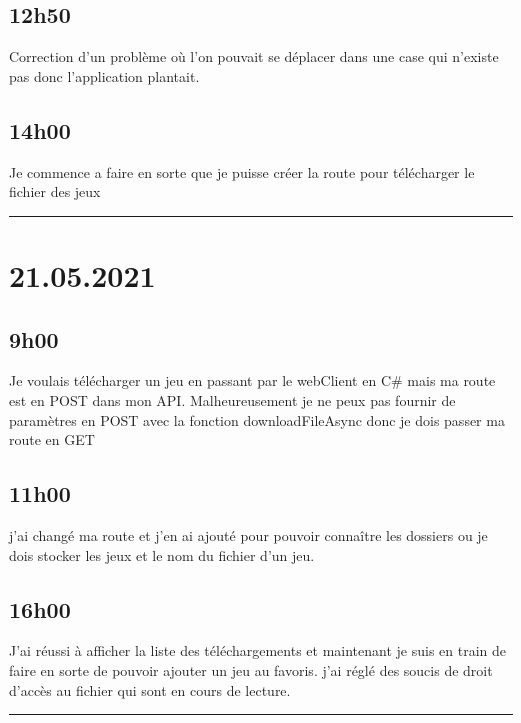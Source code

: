 \documentclass[a4paper,12pt,french]{sphinxmanual}
\begin{document}
\subsection{12h50}
\label{\detokenize{logbook:id140}}
\sphinxAtStartPar
Correction d’un problème où l’on pouvait se déplacer dans une case qui n’existe pas donc l’application plantait.


\subsection{14h00}
\label{\detokenize{logbook:id141}}
\sphinxAtStartPar
Je commence a faire en sorte que je puisse créer la route pour télécharger le fichier des jeux


\bigskip\hrule\bigskip



\section{21.05.2021}
\label{\detokenize{logbook:id142}}

\subsection{9h00}
\label{\detokenize{logbook:id143}}
\sphinxAtStartPar
Je voulais télécharger un jeu en passant par le webClient en C\# mais ma route est en POST dans mon API. Malheureusement je ne peux pas fournir de paramètres en POST avec la fonction downloadFileAsync donc je dois passer ma route en GET


\subsection{11h00}
\label{\detokenize{logbook:id144}}
\sphinxAtStartPar
j’ai changé ma route et j’en ai ajouté pour pouvoir connaître les dossiers ou je dois stocker les jeux et le nom du fichier d’un jeu.


\subsection{16h00}
\label{\detokenize{logbook:id145}}
\sphinxAtStartPar
J’ai réussi à afficher la liste des téléchargements  et maintenant  je suis en train de faire en sorte de pouvoir ajouter un jeu au favoris. j’ai réglé des soucis de droit d’accès au fichier qui sont en cours de lecture.


\bigskip\hrule\bigskip
\end{document}
